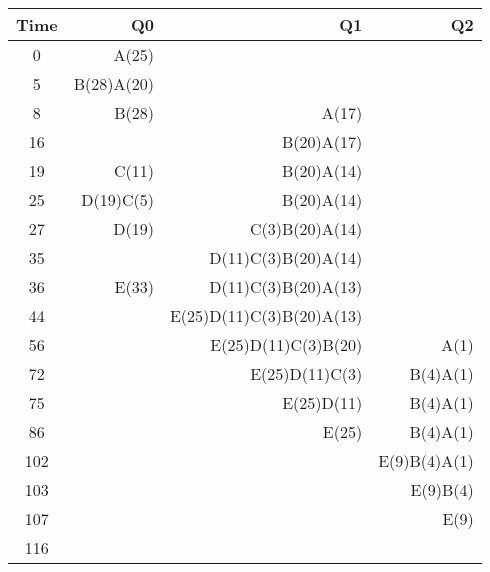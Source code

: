 \documentclass{amsart}
\begin{document}
	\begin{table}[h]
		\centering
		\caption{}
		\label{5}
		\begin{tabular}{c|r|r|r}
			Time & Q0         & Q1                       & Q2           \\ \hline
			0    & A(25)      &                          &              \\
			5    & B(28)A(20) &                          &              \\
			8    & B(28)      & A(17)                    &              \\
			16   &            & B(20)A(17)               &              \\
			19   & C(11)      & B(20)A(14)               &              \\
			25   & D(19)C(5)  & B(20)A(14)               &              \\
			27   & D(19)      & C(3)B(20)A(14)           &              \\
			35   &            & D(11)C(3)B(20)A(14)      &              \\
			36   & E(33)      & D(11)C(3)B(20)A(13)      &              \\
			44   &            & E(25)D(11)C(3)B(20)A(13) &              \\
			56   &            & E(25)D(11)C(3)B(20)      & A(1)         \\
			72   &            & E(25)D(11)C(3)           & B(4)A(1)     \\
			75   &            & E(25)D(11)               & B(4)A(1)     \\
			86   &            & E(25)                    & B(4)A(1)     \\
			102  &            &                          & E(9)B(4)A(1) \\
			103  &            &                          & E(9)B(4)     \\
			107  &            &                          & E(9)         \\
			116  &            &                          &             
		\end{tabular}
	\end{table}
	
	
	
	
	
	
	
	
	
	
	
	
	
	
	
	
	
	
	
\end{document}

